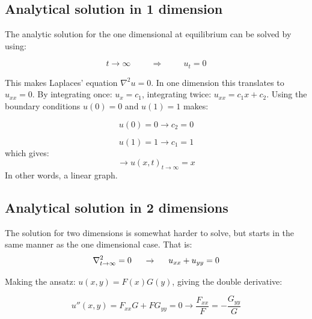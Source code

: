 \documentclass[10pt,a4paper]{article}
\begin{document}
\subsection*{Analytical solution in 1 dimension}
\noindent The analytic solution for the one dimensional at equilibrium can be solved by using:


\begin{equation} 
t\rightarrow\infty \hspace{1cm} \Rightarrow \hspace{1cm}u_t=0
\end{equation}

\noindent This makes Laplaces' equation $\nabla^2u=0$. In one dimension this translates to $u_{xx}=0$. By integrating once: $u_x=c_1$, integrating twice: $u_{xx}=c_1x+c_2$. Using the boundary conditions $u(0)=0$ and $u(1)=1$ makes:

\begin{equation}
u(0)=0\rightarrow c_2=0
\end{equation}

\begin{equation}
u(1)=1 \rightarrow c_1=1
\end{equation}
which gives:
\begin{equation}
\rightarrow u(x,t)_{t\rightarrow\infty}=x
\end{equation}
\noindent In other words, a linear graph.\\

\subsection*{Analytical solution in 2 dimensions}
The solution for two dimensions is somewhat harder to solve, but starts in the same manner as the one dimensional case. That is:\\

\begin{equation}
\nabla^2_{t\rightarrow \infty}=0 \hspace{0.5cm} \rightarrow \hspace{0.5cm} u_{xx}+u_{yy}=0
\end{equation}

\noindent Making the ansatz: $u(x,y)=F(x)G(y)$, giving the double derivative: 

\begin{equation}
u''(x,y)=F_{xx}G+FG_{yy}=0 \rightarrow \frac{F_{xx}}{F}=-\frac{G_{yy}}{G}
\end{equation}
\end{document}
